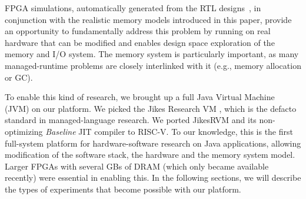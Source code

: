 FPGA simulations, automatically generated from the RTL designs~\cite{strober},
in conjunction with the realistic memory models introduced in this paper,
provide an opportunity to fundamentally address this problem by running on real
hardware that can be modified and enables design space exploration of the
memory and I/O system. The memory system is particularly important, as many
managed-runtime problems are closely interlinked with it (e.g., memory
allocation or GC).

To enable this kind of research, we brought up a full Java Virtual Machine
(JVM) on our platform. We picked the Jikes Research VM
\cite{alpern_jikes_2005}, which is the defacto standard in managed-language
research. We ported JikesRVM and its non-optimizing \emph{Baseline} JIT
compiler to RISC-V. To our knowledge, this is the first full-system platform
for hardware-software research on Java applications, allowing modification of
the software stack, the hardware and the memory system model. Larger FPGAs with
several GBs of DRAM (which only became available recently) were essential in
enabling this. In the following sections, we will describe the types of
experiments that become possible with our platform.


